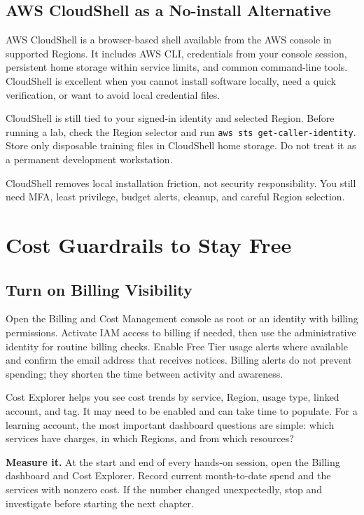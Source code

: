 \subsection{AWS CloudShell as a No-install Alternative}
AWS CloudShell is a browser-based shell available from the AWS console in supported Regions. It includes AWS CLI, credentials from your console session, persistent home storage within service limits, and common command-line tools. CloudShell is excellent when you cannot install software locally, need a quick verification, or want to avoid local credential files.

CloudShell is still tied to your signed-in identity and selected Region. Before running a lab, check the Region selector and run \texttt{aws sts get-caller-identity}. Store only disposable training files in CloudShell home storage. Do not treat it as a permanent development workstation.

\begin{tipbox}
CloudShell removes local installation friction, not security responsibility. You still need MFA, least privilege, budget alerts, cleanup, and careful Region selection.
\end{tipbox}

\section{Cost Guardrails to Stay Free}
\subsection{Turn on Billing Visibility}
Open the Billing and Cost Management console as root or an identity with billing permissions. Activate IAM access to billing if needed, then use the administrative identity for routine billing checks. Enable Free Tier usage alerts where available and confirm the email address that receives notices. Billing alerts do not prevent spending; they shorten the time between activity and awareness.

Cost Explorer helps you see cost trends by service, Region, usage type, linked account, and tag. It may need to be enabled and can take time to populate. For a learning account, the most important dashboard questions are simple: which services have charges, in which Regions, and from which resources?

\begin{tipbox}
\textbf{Measure it.} At the start and end of every hands-on session, open the Billing dashboard and Cost Explorer. Record current month-to-date spend and the services with nonzero cost. If the number changed unexpectedly, stop and investigate before starting the next chapter.
\end{tipbox}

